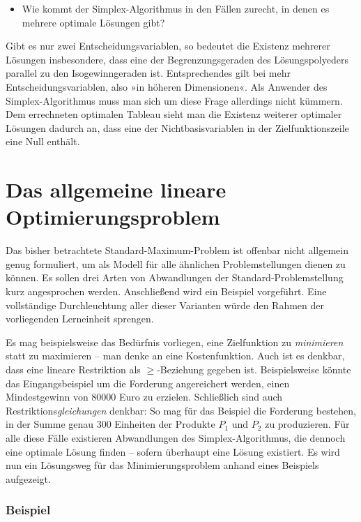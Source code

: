 \begin{itemize}
  \item Wie kommt der Simplex-Algorithmus in den Fällen zurecht, in denen es mehrere optimale Lösungen gibt?
\end{itemize}
Gibt es nur zwei Entscheidungsvariablen, so bedeutet die Existenz mehrerer Lösungen insbesondere, dass eine der Begrenzungsgeraden des Lösungspolyeders parallel zu den Isogewinngeraden ist. Entsprechendes gilt bei mehr Entscheidungsvariablen, also »in höheren Dimensionen«. Als Anwender des Simplex-Algorithmus muss man sich um diese Frage allerdings nicht kümmern. Dem errechneten optimalen Tableau sieht man die Existenz weiterer optimaler Lösungen dadurch an, dass eine der Nichtbasisvariablen in der Zielfunktionszeile eine Null enthält.

\section{Das allgemeine lineare Optimierungsproblem}


Das bisher betrachtete Standard-Maximum-Problem ist offenbar nicht allgemein genug formuliert, um als Modell für alle ähnlichen Problemstellungen dienen zu können. Es sollen drei Arten von Abwandlungen der Standard-Problemstellung kurz angesprochen werden. Anschließend wird ein Beispiel vorgeführt. Eine vollständige Durchleuchtung aller dieser Varianten würde den Rahmen der vorliegenden Lerneinheit sprengen.

Es mag beispielsweise das Bedürfnis vorliegen, eine Zielfunktion zu \emph{minimieren} statt zu maximieren -- man denke an eine Kostenfunktion. Auch ist es denkbar, dass eine lineare Restriktion als $\geq$-Beziehung gegeben ist. Beispielsweise könnte das Eingangsbeispiel um die Forderung angereichert werden, einen Mindestgewinn von 80000 Euro zu erzielen. Schließlich sind auch Restriktions\emph{gleichungen} denkbar: So mag für das Beispiel die Forderung bestehen, in der Summe genau 300 Einheiten der Produkte $P_1$ und $P_2$ zu produzieren. Für alle diese Fälle existieren Abwandlungen des Simplex-Algorithmus, die dennoch eine optimale Lösung finden -- sofern überhaupt eine Lösung existiert.
Es wird nun ein Lösungsweg für das Minimierungsproblem anhand eines Beispiels aufgezeigt.

\subsubsection{Beispiel}

